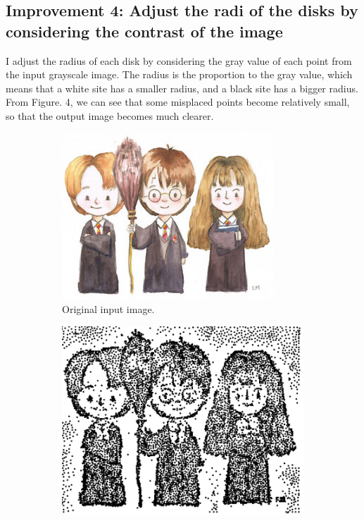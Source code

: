 \documentclass[11pt]{article}
\begin{document}
\subsection{Improvement 4: Adjust the radi of the disks by considering the contrast of the image}
I adjust the radius of each disk by considering the gray value of each point from the input grayscale image. The radius is the proportion to the gray value, which means that a white site has a smaller radius, and a black site has a bigger radius. From Figure. 4, we can see that some misplaced points become relatively small, so that the output image becomes much clearer.  
\begin{figure}[h!]
	\centering
	\begin{subfigure}[b]{0.4\linewidth}
		\includegraphics[width=\linewidth]{harry1.jpg}
		\caption{Original input image.}
	\end{subfigure}
	\begin{subfigure}[b]{0.4\linewidth}
		\includegraphics[width=\linewidth]{harry1_random.png}

\end{subfigure}
\end{figure}
\end{document}
